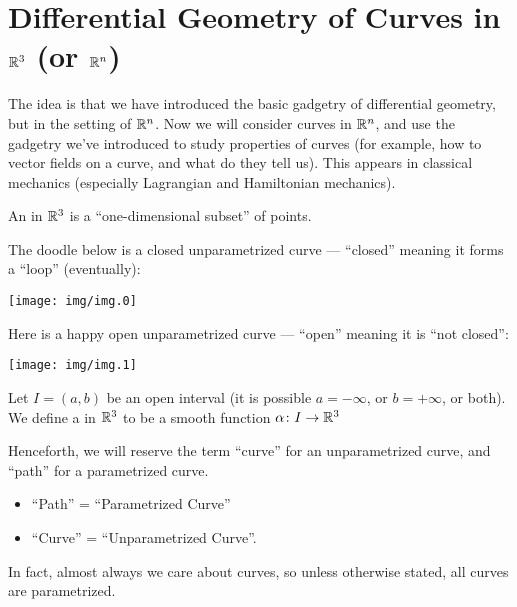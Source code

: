 \section{Differential Geometry of Curves in $\mathbb{R}^{3}$ (or $\mathbb{R}^{n}$)}

\M
The idea is that we have introduced the basic gadgetry of differential
geometry, but in the setting of $\mathbb{R}^{n}$. Now we will consider curves
in $\mathbb{R}^{n}$, and use the gadgetry we've introduced to study properties
of curves (for example, how to vector fields on a curve, and what do
they tell us). This appears in classical mechanics (especially
Lagrangian and Hamiltonian mechanics).

\begin{definition}
An  in $\mathbb{R}^{3}$ is a ``one-dimensional
subset'' of points.
\end{definition}

\begin{example}
The doodle below is a closed unparametrized curve --- ``closed'' meaning
it forms a ``loop'' (eventually):
\begin{center}
  \texttt{[image: img/img.0]}
\end{center}
\end{example}

\begin{example}
Here is a happy open unparametrized curve --- ``open'' meaning it is
``not closed'':
\begin{center}
  \texttt{[image: img/img.1]}
\end{center}
\end{example}

\begin{definition}
Let $I=(a,b)$ be an open interval (it is possible $a=-\infty$, or
$b=+\infty$, or both). We define a  in
$\mathbb{R}^{3}$ to be a smooth function $\alpha\colon I\to\mathbb{R}^{3}$
\end{definition}

\begin{remark}
Henceforth, we will reserve the term ``curve'' for an unparametrized
curve, and ``path'' for a parametrized curve.
\begin{itemize}
\item ``Path'' = ``Parametrized Curve''
\item ``Curve'' = ``Unparametrized Curve''.
\end{itemize}
In fact, almost always we care about curves, so unless otherwise stated,
all curves are parametrized.
\end{remark}

